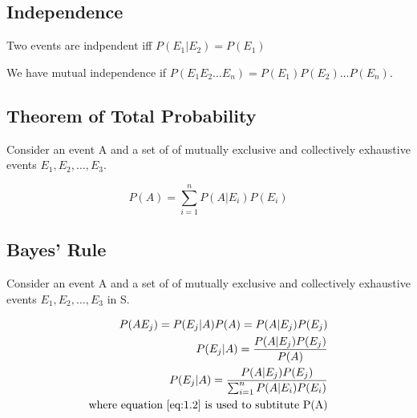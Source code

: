 \vspace{.5cm}

\subsection*{Independence}
Two events are indpendent iff $P(E_1|E_2) = P(E_1)$

We have mutual independence if $P(E_1E_2 \ldots E_n) = P(E_1)P(E_2) \ldots P(E_n)$.

\vspace{.5cm}

\subsection*{Theorem of Total Probability}
Consider an event A and a set of of mutually exclusive and collectively exhaustive events $E_1, E_2, \ldots, E_3$.

\begin{equation} \label{eq:1.2}
    P(A) = \sum_{i=1}^{n}P(A|E_i)P(E_i)
\end{equation}

\vspace{.5cm}

\vspace{.5cm}

\subsection*{Bayes' Rule}
Consider an event A and a set of of mutually exclusive and collectively exhaustive events $E_1, E_2, \ldots, E_3$ in S.

\begin{align*}
    P(AE_j) = P(E_j|A)P(A) = P(A|E_j)P(E_j) \\
    P(E_j|A) = \frac{P(A|E_j)P(E_j)}{P(A)} \\
    P(E_j|A) = \frac{P(A|E_j)P(E_j)}{\sum_{i=1}^{n}P(A|E_i)P(E_i)}\\ \text{where equation \ref{eq:1.2} is used to subtitute P(A)}
\end{align*}